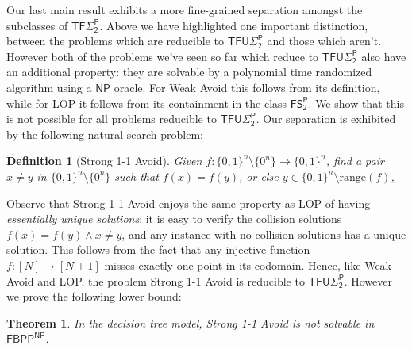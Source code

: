 \documentclass[11pt]{article}
\newtheorem{theorem}{Theorem}
\newtheorem{definition}{Definition}
\newcommand{\B}{\{0,1\}}
\newcommand{\rng}{\mathrm{range}}
\begin{document}
Our last main result exhibits a more fine-grained separation amongst the subclasses of $\mathsf{TF\Sigma_2^P}$. Above we have highlighted one important distinction, between the problems which are reducible to $\mathsf{TFU\Sigma_2^P}$ and those which aren't. However both of the problems we've seen so far which reduce to $\mathsf{TFU\Sigma_2^P}$ also have an additional property: they are solvable by a polynomial time randomized algorithm using a $\mathsf{NP}$ oracle. For Weak Avoid this follows from its definition, while for LOP it follows from its containment in the class $\mathsf{FS_2^P}$. We show that this is not possible for all problems reducible to $\mathsf{TFU\Sigma_2^P}$. Our separation is exhibited by the following natural search problem: 
\begin{definition}[Strong 1-1 Avoid]
Given $f: \B^n \setminus \{0^n\} \to \B^n$, find a pair $x\neq y $ in $\B^n \setminus \{0^n\}$ such that $f(x)=f(y)$, or else $y \in \B^n \setminus \rng(f)$, 
\end{definition}
Observe that Strong 1-1 Avoid enjoys the same property as LOP of having \emph{essentially unique solutions}: it is easy to verify the collision solutions $f(x)=f(y) \land x\neq y$, and any instance with no collision solutions has a unique solution. This follows from the fact that any injective function $f: [N] \to [N+1]$ misses exactly one point in its codomain. Hence, like Weak Avoid and LOP, the problem Strong 1-1 Avoid is reducible to $\mathsf{TFU\Sigma_2^P}$. However we prove the following lower bound:

\begin{theorem}
\label{thm:bpp-np-lb}
In the decision tree model, Strong 1-1 Avoid is not solvable in $\mathsf{FBPP^{NP}}$.
\end{theorem}
\end{document}
